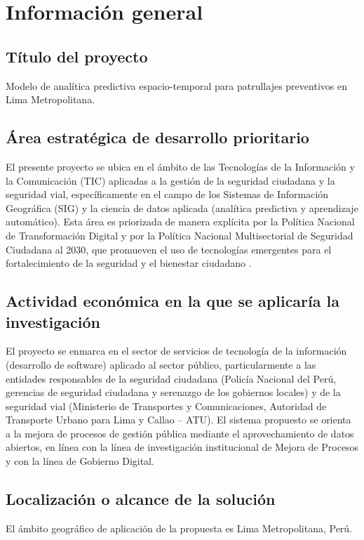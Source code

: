 \documentclass[12pt,letterpaper]{report}
\begin{document}
\chapter{Informaci\'on general}

\section{T\'itulo del proyecto}
Modelo de anal\'itica predictiva espacio-temporal para patrullajes preventivos en Lima Metropolitana.

\section{\'Area estrat\'egica de desarrollo prioritario}
El presente proyecto se ubica en el \'ambito de las Tecnolog\'ias de la Informaci\'on y la Comunicaci\'on (TIC) aplicadas a la gesti\'on de la seguridad ciudadana y la seguridad vial, espec\'ificamente en el campo de los Sistemas de Informaci\'on Geogr\'afica (SIG) y la ciencia de datos aplicada (analítica predictiva y aprendizaje autom\'atico). Esta \'area es priorizada de manera expl\'icita por la Pol\'itica Nacional de Transformaci\'on Digital y por la Pol\'itica Nacional Multisectorial de Seguridad Ciudadana al 2030, que promueven el uso de tecnolog\'ias emergentes para el fortalecimiento de la seguridad y el bienestar ciudadano \citep{talla2025geolocalizacion}.

\section{Actividad econ\'omica en la que se aplicar\'ia la investigaci\'on}
El proyecto se enmarca en el sector de servicios de tecnolog\'ia de la informaci\'on (desarrollo de software) aplicado al sector p\'ublico, particularmente a las entidades responsables de la seguridad ciudadana (Polic\'ia Nacional del Per\'u, gerencias de seguridad ciudadana y serenazgo de los gobiernos locales) y de la seguridad vial (Ministerio de Transportes y Comunicaciones, Autoridad de Transporte Urbano para Lima y Callao -- ATU). El sistema propuesto se orienta a la mejora de procesos de gesti\'on p\'ublica mediante el aprovechamiento de datos abiertos, en l\'inea con la l\'inea de investigaci\'on institucional de Mejora de Procesos y con la l\'inea de Gobierno Digital.

\section{Localizaci\'on o alcance de la soluci\'on}
El \'ambito geogr\'afico de aplicaci\'on de la propuesta es Lima Metropolitana, Per\'u.
\end{document}
